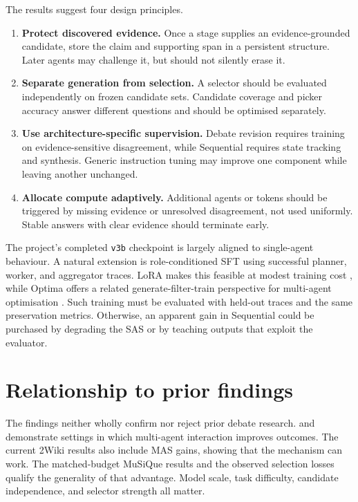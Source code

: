 The results suggest four design principles.

\begin{enumerate}[leftmargin=*]
  \item \textbf{Protect discovered evidence.} Once a stage supplies an evidence-grounded candidate, store the claim and supporting span in a persistent structure. Later agents may challenge it, but should not silently erase it.
  \item \textbf{Separate generation from selection.} A selector should be evaluated independently on frozen candidate sets. Candidate coverage and picker accuracy answer different questions and should be optimised separately.
  \item \textbf{Use architecture-specific supervision.} Debate revision requires training on evidence-sensitive disagreement, while Sequential requires state tracking and synthesis. Generic instruction tuning may improve one component while leaving another unchanged.
  \item \textbf{Allocate compute adaptively.} Additional agents or tokens should be triggered by missing evidence or unresolved disagreement, not used uniformly. Stable answers with clear evidence should terminate early.
\end{enumerate}

The project's completed \texttt{v3b} checkpoint is largely aligned to single-agent behaviour. A natural extension is role-conditioned SFT using successful planner, worker, and aggregator traces. LoRA makes this feasible at modest training cost \citep{hu2021lora}, while Optima offers a related generate-filter-train perspective for multi-agent optimisation \citep{chen2024optima}. Such training must be evaluated with held-out traces and the same preservation metrics. Otherwise, an apparent gain in Sequential could be purchased by degrading the SAS or by teaching outputs that exploit the evaluator.

\section{Relationship to prior findings}

The findings neither wholly confirm nor reject prior debate research. \citet{du2023debate} and \citet{liang2023mad} demonstrate settings in which multi-agent interaction improves outcomes. The current 2Wiki results also include MAS gains, showing that the mechanism can work. The matched-budget MuSiQue results and the observed selection losses qualify the generality of that advantage. Model scale, task difficulty, candidate independence, and selector strength all matter.

